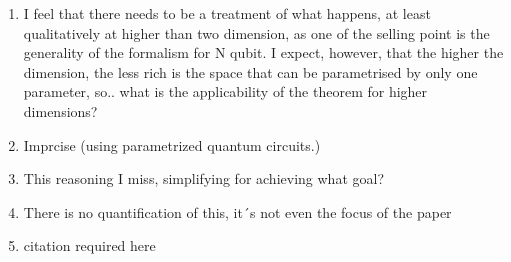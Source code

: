 \documentclass[10pt,letterpaper]{article} %
\begin{document}
\begin{enumerate}
 \item I feel that there needs to be a treatment of what happens, at least qualitatively at higher than two dimension, as one of the selling point is the generality of the formalism for N qubit. I expect, however, that the higher the dimension, the less rich is the space that can be parametrised by only one parameter, so.. what is the applicability of the theorem for higher dimensions?
 
 \item Imprcise (using parametrized quantum
circuits.)
 
 
 
 \item This reasoning I miss, simplifying for achieving what goal? 
  
 \item There is no quantification of this, it´s not even the focus of the paper 
 
 \item citation required here
\end{enumerate}
\end{document}
